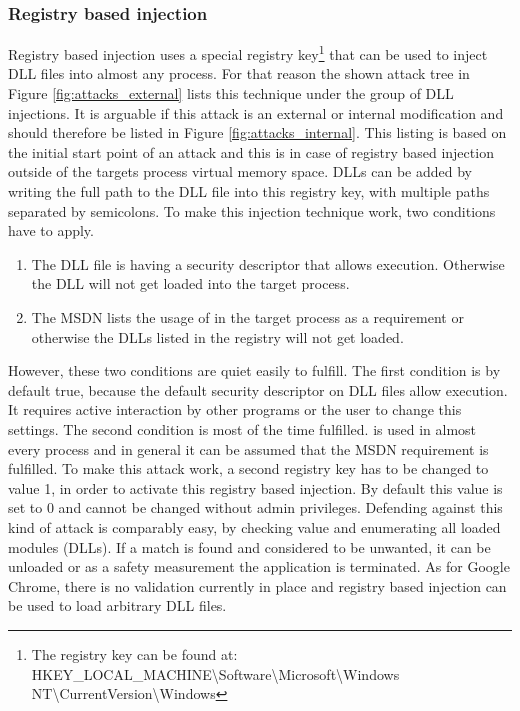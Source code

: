 \subsubsection{Registry based injection}
Registry based injection uses a special registry key\footnote{The registry key can be found at: HKEY\_LOCAL\_MACHINE\textbackslash Software\textbackslash Microsoft\textbackslash Windows NT\textbackslash CurrentVersion\textbackslash Windows} that can be used to inject DLL files into almost any process. For that reason the shown attack tree in Figure \ref{fig:attacks_external} lists this technique under the group of DLL injections. It is arguable if this attack is an external or internal modification and should therefore be listed in Figure \ref{fig:attacks_internal}. This listing is based on the initial start point of an attack and this is in case of registry based injection outside of the targets process virtual memory space. DLLs can be added by writing the full path to the DLL file into this registry key, with multiple paths separated by semicolons. To make this injection technique work, two conditions have to apply.
\begin{enumerate}
\item The DLL file is having a security descriptor that allows execution. Otherwise the DLL will not get loaded into the target process.
\item The MSDN\cite{msdn_appinitdlls} lists the usage of  in the target process as a requirement or otherwise the DLLs listed in the registry will not get loaded.
\end{enumerate}
However, these two conditions are quiet easily to fulfill. The first condition is by default true, because the default security descriptor on DLL files allow execution. It requires active interaction by other programs or the user to change this settings. The second condition is most of the time fulfilled.  is used in almost every process and in general it can be assumed that the MSDN requirement is fulfilled. To make this attack work, a second registry key  has to be changed to value 1, in order to activate this registry based injection. By default this value is set to 0 and cannot be changed without admin privileges.
Defending against this kind of attack is comparably easy, by checking  value and enumerating all loaded modules (DLLs). If a match is found and considered to be unwanted, it can be unloaded or as a safety measurement the application is terminated. As for Google Chrome, there is no validation currently in place and registry based injection can be used to load arbitrary DLL files.